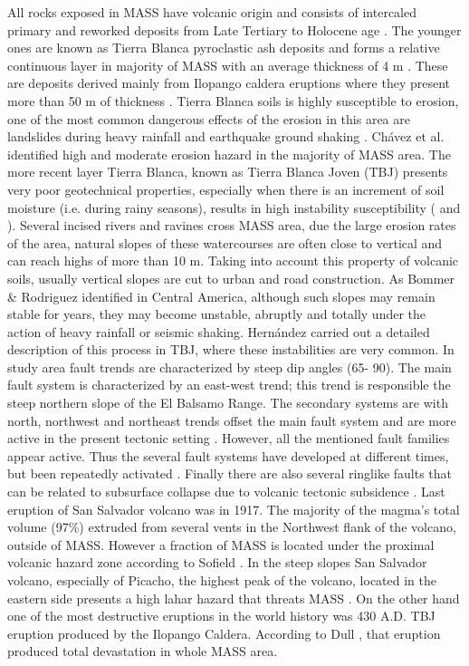 \documentclass[11pt,twoside]{rmta2010esp}%
\begin{document}
All rocks exposed in MASS have volcanic origin and consists of intercaled primary and reworked deposits from Late Tertiary to Holocene age \cite{schmidt1975}. The younger ones are known as Tierra Blanca pyroclastic ash deposits and forms a relative continuous layer in majority of MASS with an average thickness of 4 m \cite{schmidt1975}. These are deposits derived mainly from Ilopango caldera eruptions where they present more than 50 m of thickness \cite{schmidt1975}. Tierra Blanca soils is highly susceptible to erosion, one of the most common dangerous effects of the erosion in this area are landslides during heavy rainfall and earthquake ground shaking \cite{schmidt1975}. Ch\'{a}vez et al. \cite{chavez2014a} identified high and moderate erosion hazard in the majority of MASS area. The more recent layer Tierra Blanca, known as Tierra Blanca Joven (TBJ) \cite{hernan2004} presents very poor geotechnical properties, especially when there is an increment of soil moisture (i.e. during rainy seasons), results in high instability susceptibility (\cite{chavez2014b} and \cite{rolo2004}). Several incised rivers and ravines cross MASS area, due the large erosion rates of the area, natural slopes of these watercourses are often close to vertical and can reach highs of more than 10 m. Taking into account this property of volcanic soils, usually vertical slopes are cut to urban and road construction. As Bommer \& Rodriguez \cite{bommer} identified in Central America, although such slopes may remain stable for years, they may become unstable, abruptly and totally under the action of heavy rainfall or seismic shaking. Hern\'{a}ndez \cite{hernan2004} carried out a detailed description of this process in TBJ, where these instabilities are very common. 
In study area fault trends are characterized by steep dip angles (65\textdegree - 90\textdegree). The main fault system is characterized by an east-west trend; this trend is responsible the steep northern slope of the El Balsamo Range.  The secondary systems are with north, northwest and northeast trends offset the main fault system and are more active in the present tectonic setting \cite{schmidt1975}. However, all the mentioned fault families appear active. Thus the several fault systems have developed at different times, but been repeatedly activated \cite{rymer1987}. Finally there are also several ringlike faults that can be related to subsurface collapse due to volcanic tectonic subsidence \cite{schmidt1975}.
Last eruption of San Salvador volcano was in 1917.  The majority of the magma's total volume (97\%) extruded from several vents in the Northwest flank of the volcano, outside of MASS. However a fraction of MASS is located under the proximal volcanic hazard zone according to Sofield \cite{sofield2004}. In the steep slopes  San Salvador volcano, especially of Picacho, the highest peak of the volcano, located in the eastern side presents a high lahar hazard that threats MASS \cite{major2004}. On the other hand one of the most destructive eruptions in the world history was 430 A.D. TBJ eruption produced by the Ilopango Caldera. According to Dull \cite{dull2004}, that eruption produced total devastation in whole MASS area. 
\end{document}
